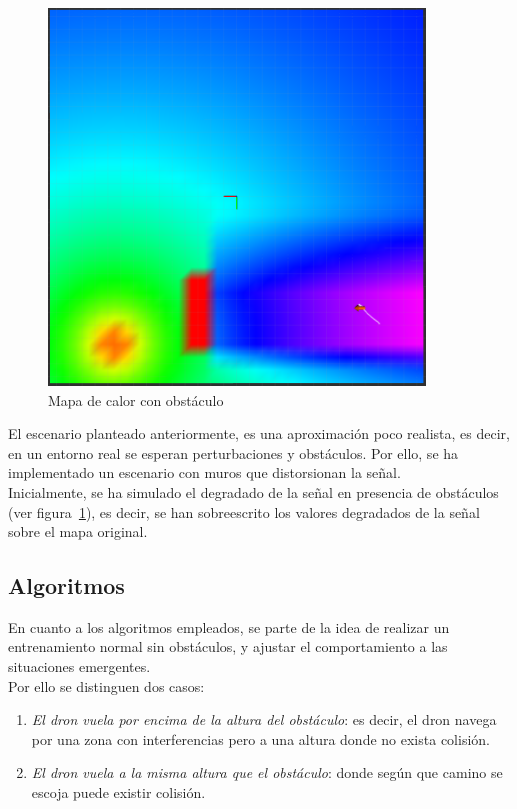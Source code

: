 \begin{figure} [tp]
    \begin{center}
    \includegraphics[height=10cm]{imagenes/cap4/34_hm.png}
    \end{center}
    \caption[Mapa de calor con obstáculo]{Mapa de calor con obstáculo}
    \label{fig:obshm}
\end{figure}

El escenario planteado anteriormente, es una aproximación poco realista, es decir, en un entorno real se esperan perturbaciones y obstáculos. Por ello, se ha implementado un escenario con muros que distorsionan la señal.\\

Inicialmente, se ha simulado el degradado de la señal en presencia de obstáculos (ver figura~\ref{fig:obshm}), es decir, se han sobreescrito los valores degradados de la señal sobre el mapa original.\\

\subsection{Algoritmos}
\label{subsec:algoritmo_sfo}

En cuanto a los algoritmos empleados, se parte de la idea de realizar un entrenamiento normal sin obstáculos, y ajustar el comportamiento a las situaciones emergentes.\\

Por ello se distinguen dos casos:

\begin{enumerate}
    \item \emph{El dron vuela por encima de la altura del obstáculo}: es decir, el dron navega por una zona con interferencias pero a una altura donde no exista colisión.
    \item \emph{El dron vuela a la misma altura que el obstáculo}: donde según que camino se escoja puede existir colisión.
\end{enumerate}


